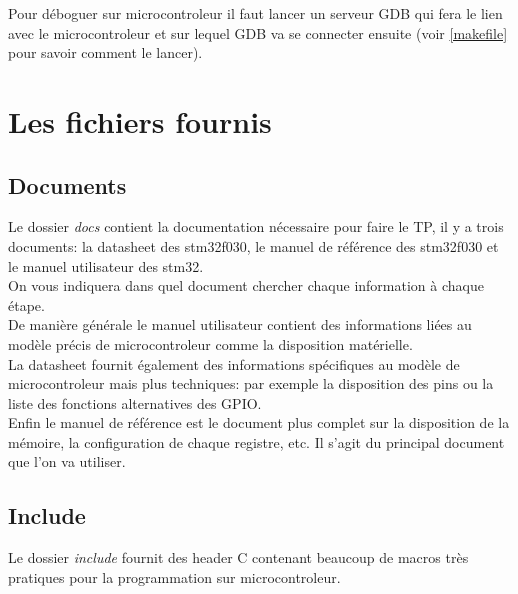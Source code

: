 \documentclass[a4paper,10pt]{article} %
\begin{document}
Pour déboguer sur microcontroleur il faut lancer un serveur GDB qui fera le lien avec le microcontroleur et sur lequel GDB va se connecter ensuite (voir \autoref{makefile}  pour savoir comment le lancer).

\section{\label{fichiers_fournis}Les fichiers fournis}
\subsection{\label{documents}Documents}
Le dossier \textit{docs} contient la documentation nécessaire pour faire le TP, il y a trois documents: la datasheet des stm32f030, le manuel de référence des stm32f030 et le manuel utilisateur des stm32.\\

On vous indiquera dans quel document chercher chaque information à chaque étape.\\

De manière générale le manuel utilisateur contient des informations liées au modèle précis de microcontroleur comme la disposition matérielle.\\

La datasheet fournit également des informations spécifiques au modèle de microcontroleur mais plus techniques: par exemple la disposition des pins ou la liste des fonctions alternatives des GPIO.\\

Enfin le manuel de référence est le document plus complet sur la disposition de la mémoire, la configuration de chaque registre, etc. Il s'agit du principal document que l'on va utiliser.

\subsection{\label{include}Include}
Le dossier \textit{include} fournit des header C contenant beaucoup de macros très pratiques pour la programmation sur microcontroleur.\\
\end{document}
